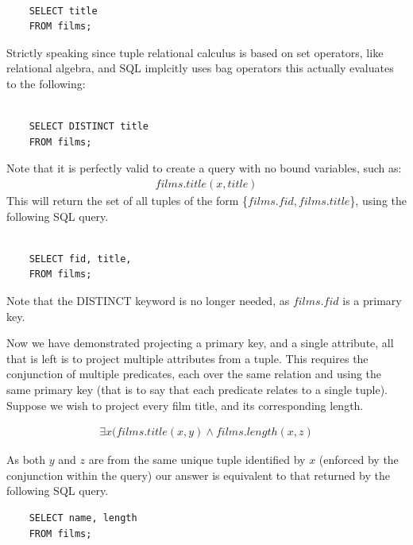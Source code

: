 \documentclass[a4paper, 11pt]{article}
\begin{document}
    \begin{verbatim}

    SELECT title
    FROM films;

    \end{verbatim}

    Strictly speaking since tuple relational calculus is based on set
    operators, like relational algebra, and SQL implcitly uses bag operators
    this actually evaluates to the following:

    \begin{verbatim}

    SELECT DISTINCT title
    FROM films;

    \end{verbatim}

    Note that it is perfectly valid to create a query with no bound variables,
    such as:
    \begin{gather}
      films.title(x, title) \label{select2}
    \end{gather}
    This will return the set of all tuples of the form \{$films.fid,
    films.title$\}, using the following SQL query.

    \begin{verbatim}

    SELECT fid, title,
    FROM films;

    \end{verbatim}

    Note that the DISTINCT keyword is no longer needed, as $films.fid$ is a
    primary key.

    Now we have demonstrated projecting a primary key, and a single attribute,
    all that is left is to project multiple attributes from a tuple. This
    requires the conjunction of multiple predicates, each over the same
    relation and using the same primary key (that is to say that each predicate
    relates to a single tuple). Suppose we wish to project
    every film title, and its corresponding length.

    \begin{gather}
      \exists x(films.title(x, y) \land films.length(x, z)
    \end{gather}

    As both $y$ and $z$ are from the same unique tuple identified by $x$
    (enforced by the conjunction within the query) our
    answer is equivalent to that returned by the following SQL query.

    \begin{verbatim}
    SELECT name, length
    FROM films;
    \end{verbatim}
\end{document}
